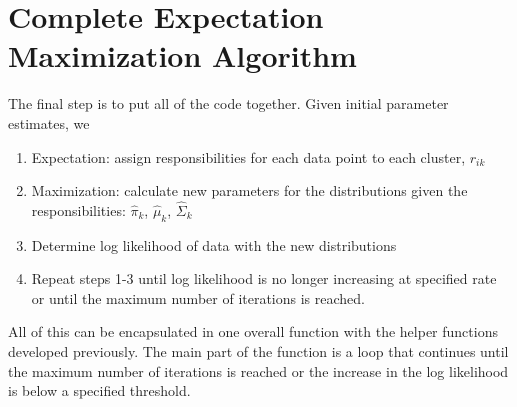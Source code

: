 \documentclass[12pt]{article}
\providecommand{\tightlist}{%
      \setlength{\itemsep}{0pt}\setlength{\parskip}{0pt}}
\begin{document}
    \hypertarget{complete-expectation-maximization-algorithm}{%
\section{Complete Expectation Maximization
Algorithm}\label{complete-expectation-maximization-algorithm}}

The final step is to put all of the code together. Given initial
parameter estimates, we

\begin{enumerate}
\def\labelenumi{\arabic{enumi}.}
\tightlist
\item
  Expectation: assign responsibilities for each data point to each
  cluster, \(r_{ik}\)
\item
  Maximization: calculate new parameters for the distributions given the
  responsibilities: \(\hat{\pi}_k\), \(\hat{\mu}_k\), \(\hat{\Sigma}_k\)
\item
  Determine log likelihood of data with the new distributions
\item
  Repeat steps 1-3 until log likelihood is no longer increasing at
  specified rate or until the maximum number of iterations is reached.
\end{enumerate}

All of this can be encapsulated in one overall function with the helper
functions developed previously. The main part of the function is a loop
that continues until the maximum number of iterations is reached or the
increase in the log likelihood is below a specified threshold.
\end{document}
